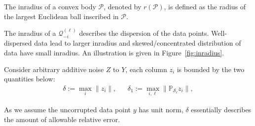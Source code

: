 \documentclass[twoside,11pt]{article}
\numberwithin{equation}{section}
\begin{document}

\begin{definition}[inradius]
The inradius of a convex body $\mathcal{P}$, denoted by $r(\mathcal{P})$, is defined as the radius of the largest Euclidean ball inscribed in $\mathcal{P}$.
\end{definition}
The inradius of a $\mathcal{Q}_{-i}^{(\ell)}$ describes the dispersion of the data points. Well-dispersed data lead to larger inradius and skewed/concentrated distribution of data have small inradius. An illustration is given in Figure~\ref{fig:inradius}.


\begin{definition}
Consider arbitrary additive noise $Z$ to $Y$, each column $z_i$ is bounded by the two quantities below:
\begin{align*}
  \delta:= \max_i\|z_i\|, && \delta_1:=\max_{i,\ell}\|\mathbb{P}_\mathcal{S_{\ell}}z_i\|,
\end{align*}
\end{definition}
As we assume the uncorrupted data point $y$ has unit norm, $\delta$ essentially describes the amount of allowable relative error.
\end{document}
